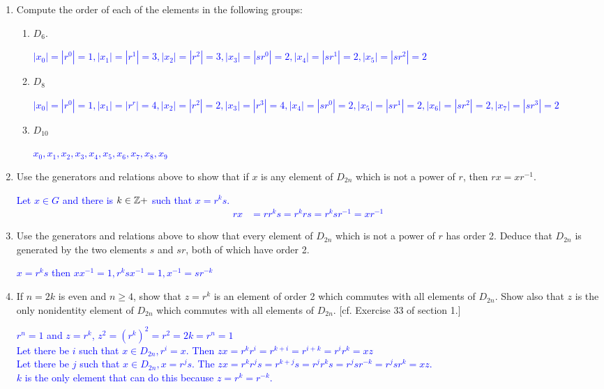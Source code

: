 \documentclass[10pt,a4paper]{report}
\newcommand{\BLUE}[1]{\textcolor{blue}{#1}}
\begin{document}
\begin{enumerate}

\item Compute the order of each of the elements in the following groups:
	\begin{enumerate}
	\item $D_6$.
	
	\BLUE{$|x_0|=|r^0|=1, |x_1|=|r^1|=3, |x_2|=|r^2|=3,|x_3|=|sr^0|=2, |x_4|=|sr^1|=2,|x_5|=|sr^2|=2$
	}
	
	\item $D_8$
	
	\BLUE{$|x_0|=|r^0|=1, |x_1|=|r^r|=4, |x_2|=|r^2|=2,|x_3|=|r^3|=4, |x_4|=|sr^0|=2,|x_5|=|sr^1|=2, |x_6|=|sr^2|=2,|x_7|=|sr^3|=2$
	}
	
	\item$D_{10}$
	
	\BLUE{$x_0, x_1, x_2,x_3, x_4,x_5, x_6,x_7, x_8, x_9$
	}
	
	\end{enumerate}

\item Use the generators and relations above to show that if $x$ is any element of $D_{2n}$ which is not a power of $r$, then $rx=xr^{-1}$.

\BLUE{
	Let $x \in G$ and there is $k\in \mathbb{Z}+$ such that $x=r^ks$.
  	\begin{align*}
  		rx&=rr^ks = r^krs = r^ksr^{-1} = xr^{-1}
	\end{align*}   
  }

\item Use the generators and relations above to show that every element of $D_{2n}$ which is not a power of $r$ has order 2.  Deduce that $D_{2n}$ is generated by the two elements $s$ and $sr$, both of which have order 2.

\BLUE{$x=r^ks$ then $ xx^{-1}=1, r^ksx^{-1}=1, x^{-1}=sr^{-k}$
}

\item If $n=2k$ is even and $n \ge 4$, show that $z=r^k$ is an element of order 2 which commutes with all elements of $D_{2n}$.  Show also that $z$ is the only nonidentity element of $D_{2n}$ which commutes with all elements of $D_{2n}$. [cf. Exercise 33 of section 1.]

\BLUE{$r^n=1$  and $z=r^k$, $z^2=(r^k)^2=r^2={2k}=r^n=1$\\
Let there be $i$ such that  $x\in D_{2n}, r^i=x$.  Then $zx = r^kr^i=r^{k+i}=r^{i+k}=r^ir^k=xz$\\
Let there be $j$ such that $x\in D_{2n}, x=r^js$.  The $zx = r^kr^js = r^{k+j}s=r^{j}r^ks=r^jsr^{-k}=r^jsr^k=xz$.\\
$k$ is the only element that can do this because $z=r^k=r^{-k}$.
}


\end{enumerate}
\end{document}
